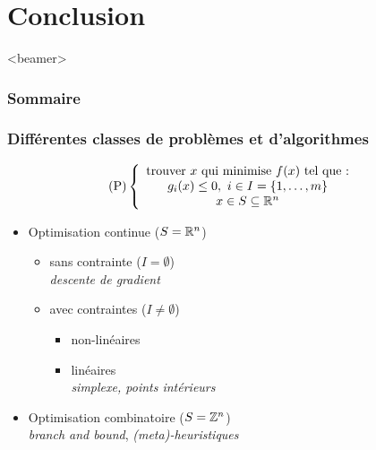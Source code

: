 \documentclass{beamer}
\newcommand{\Z}{{\ensuremath\mathbb{Z}}}
\newcommand{\R}{{\ensuremath\mathbb{R}}}
\begin{document}


\section{Conclusion}

\begin{frame}<beamer>
  \frametitle{Sommaire}
  \tableofcontents[currentsection]
\end{frame}

\begin{frame}
  \frametitle{Différentes classes de problèmes et d'algorithmes}

  \[
  \text{(P)} \left\{
  \begin{array}{c}
    \text{trouver} \ x \ \text{qui minimise} \ f(x) \ \text{tel que :} \\
    g_i(x) \leq 0, \ i \in I = \{1, \dots, m\} \\
    x \in S \subseteq \R^n
  \end{array}
  \right.
  \]

  \begin{itemize}
  \item Optimisation continue ($S = \R^n$)
    \begin{itemize}
    \item sans contrainte ($I = \emptyset$) \\
      \emph{descente de gradient}
    \item avec contraintes ($I \neq \emptyset$) 
      \begin{itemize}
        \item non-linéaires
        \item linéaires \\
        \emph{simplexe, points intérieurs}
      \end{itemize}
    \end{itemize}
  \item Optimisation combinatoire ($S = \Z^n$)\\
    \emph{branch and bound}, \emph{(meta)-heuristiques} 
  \end{itemize}
  
\end{frame}
\end{document}
